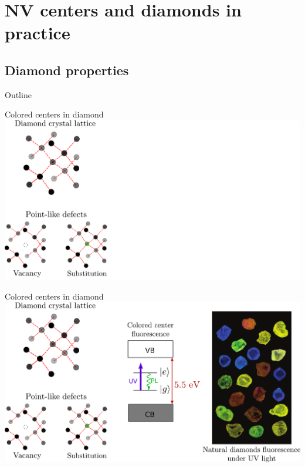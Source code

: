 \documentclass{beamer}
\begin{document}


\section{NV centers and diamonds in practice}
\subsection{Diamond properties}
\begin{frame}{Outline}
\tableofcontents[currentsection]
\end{frame}

\begin{frame}{Colored centers in diamond}
\centering
\includegraphics[width=\textwidth,height=0.85\textheight,keepaspectratio]{Slide diamant_0}
\end{frame}

\begin{frame}{Colored centers in diamond}
\centering
\includegraphics[width=\textwidth,height=0.85\textheight,keepaspectratio]{Slide diamant}
\end{frame}
\end{document}
